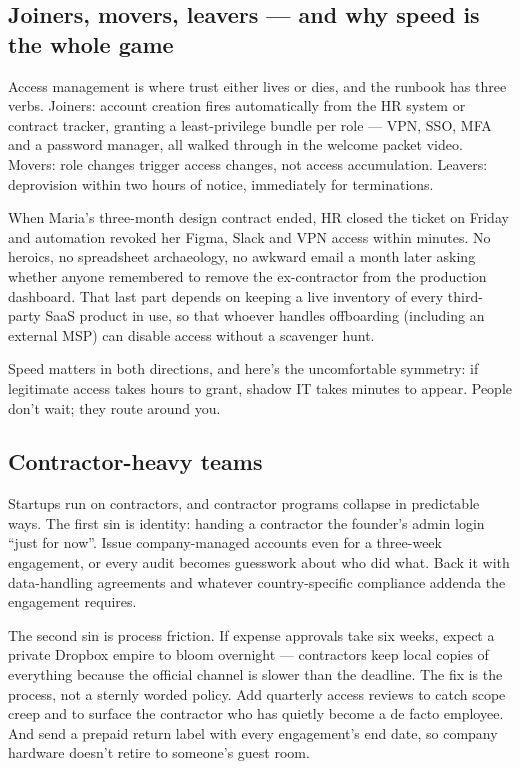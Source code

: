 \subsection{Joiners, movers, leavers — and why speed is the whole game}


Access management is where trust either lives or dies, and the runbook has three verbs. Joiners: account creation fires automatically from the HR system or contract tracker, granting a least-privilege bundle per role — VPN, SSO, MFA and a password manager, all walked through in the welcome packet video. Movers: role changes trigger access changes, not access accumulation. Leavers: deprovision within two hours of notice, immediately for terminations.


When Maria's three-month design contract ended, HR closed the ticket on Friday and automation revoked her Figma, Slack and VPN access within minutes. No heroics, no spreadsheet archaeology, no awkward email a month later asking whether anyone remembered to remove the ex-contractor from the production dashboard. That last part depends on keeping a live inventory of every third-party SaaS product in use, so that whoever handles offboarding (including an external MSP) can disable access without a scavenger hunt.


Speed matters in both directions, and here's the uncomfortable symmetry: if legitimate access takes hours to grant, shadow IT takes minutes to appear. People don't wait; they route around you.



\subsection{Contractor-heavy teams}


Startups run on contractors, and contractor programs collapse in predictable ways. The first sin is identity: handing a contractor the founder's admin login ``just for now''. Issue company-managed accounts even for a three-week engagement, or every audit becomes guesswork about who did what. Back it with data-handling agreements and whatever country-specific compliance addenda the engagement requires.


The second sin is process friction. If expense approvals take six weeks, expect a private Dropbox empire to bloom overnight — contractors keep local copies of everything because the official channel is slower than the deadline. The fix is the process, not a sternly worded policy. Add quarterly access reviews to catch scope creep and to surface the contractor who has quietly become a de facto employee. And send a prepaid return label with every engagement's end date, so company hardware doesn't retire to someone's guest room.




